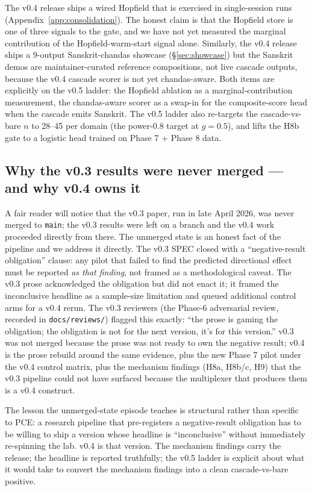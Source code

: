 The v0.4 release ships a wired Hopfield  that is exercised in single-session runs (Appendix~\ref{app:consolidation}). The honest claim is that the Hopfield store is one of three signals to the  gate, and we have not yet measured the marginal contribution of the Hopfield-warm-start signal alone. Similarly, the v0.4 release ships a 9-output Sanskrit-chandas showcase (\S\ref{sec:showcase}) but the Sanskrit demos are maintainer-curated reference compositions, not live cascade outputs, because the v0.4 cascade scorer is not yet chandas-aware. Both items are explicitly on the v0.5 ladder: the Hopfield ablation as a marginal-contribution measurement, the chandas-aware scorer as a swap-in for the composite-score head when the cascade emits Sanskrit. The v0.5 ladder also re-targets the cascade-vs-bare $n$ to 28--45 per domain (the power-0.8 target at $g=0.5$), and lifts the H8b gate to a logistic head trained on Phase 7 + Phase 8 data.

\subsection{Why the v0.3 results were never merged --- and why v0.4 owns it}

A fair reader will notice that the v0.3 paper, run in late April 2026, was never merged to \texttt{main}; the v0.3 results were left on a branch and the v0.4 work proceeded directly from there. The unmerged state is an honest fact of the pipeline and we address it directly. The v0.3 SPEC closed with a ``negative-result obligation'' clause: any pilot that failed to find the predicted directional effect must be reported \emph{as that finding}, not framed as a methodological caveat. The v0.3 prose acknowledged the obligation but did not enact it; it framed the inconclusive headline as a sample-size limitation and queued additional control arms for a v0.4 rerun. The v0.3 reviewers (the Phase-6 adversarial review, recorded in \texttt{docs/reviews/}) flagged this exactly: ``the prose is gaming the obligation; the obligation is not for the next version, it's for this version.'' v0.3 was not merged because the prose was not ready to own the negative result; v0.4 is the prose rebuild around the same evidence, plus the new Phase 7 pilot under the v0.4 control matrix, plus the mechanism findings (H8a, H8b/c, H9) that the v0.3 pipeline could not have surfaced because the multiplexer that produces them is a v0.4 construct.

The lesson the unmerged-state episode teaches is structural rather than specific to PCE: a research pipeline that pre-registers a negative-result obligation has to be willing to ship a version whose headline is ``inconclusive'' without immediately re-spinning the lab. v0.4 is that version. The mechanism findings carry the release; the headline is reported truthfully; the v0.5 ladder is explicit about what it would take to convert the mechanism findings into a clean cascade-vs-bare positive.
